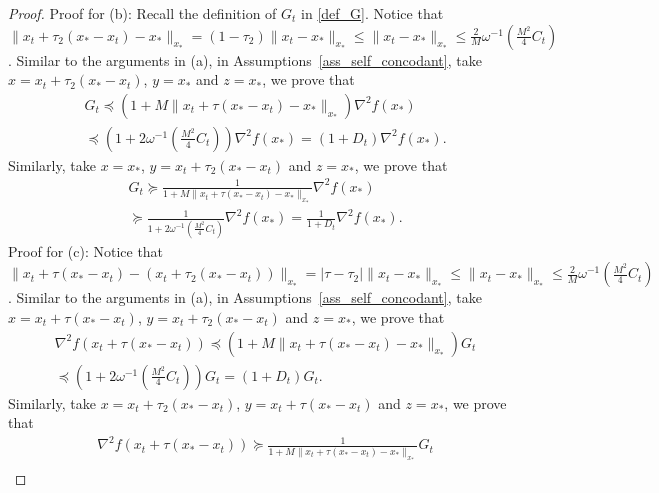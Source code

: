 \documentclass[11pt,letterpaper]{article}
\newcommand\0{{\Vector{0}}}
\newcommand\1{{\Vector{1}}}
\numberwithin{assumption}{section}
\numberwithin{definition}{section}
\numberwithin{theorem}{section}
\numberwithin{remark}{section}
\begin{document}
\begin{proof}
    Proof for (b): Recall the definition of $G_t$ in \eqref{def_G}. Notice that $\|x_t + \tau_2 (x_{*} - x_t) - x_*\|_{x_*} = (1 - \tau_2)\|x_t - x_*\|_{x_*} \leq \|x_t - x_*\|_{x_*} \leq \frac{2}{M}\omega^{-1}(\frac{M^2}{4}C_t)$. Similar to the arguments in (a), in Assumptions~\ref{ass_self_concodant}, take $x = x_t + \tau_2 (x_{*} - x_t)$, $y = x_*$ and $z = x_*$, we prove that 
    \begin{equation}
    \begin{split}
        & G_t \preceq (1 + M\|x_t + \tau (x_{*} - x_t) - x_*\|_{x_*})\nabla^2{f(x_*)} \\
        & \preceq (1 + 2\omega^{-1}(\frac{M^2}{4}C_t))\nabla^2{f(x_*)} = (1 + D_t)\nabla^2{f(x_*)}.
    \end{split}
    \end{equation}
    Similarly, take $x = x_*$, $y = x_t + \tau_2 (x_{*} - x_t)$ and $z = x_*$, we prove that 
    \begin{equation}
    \begin{split}
        & G_t \succeq \frac{1}{1 + M\|x_t + \tau (x_{*} - x_t) - x_*\|_{x_*}}\nabla^2{f(x_*)} \\
        & \succeq \frac{1}{1 + 2\omega^{-1}(\frac{M^2}{4}C_t)}\nabla^2{f(x_*)} = \frac{1}{1 + D_t}\nabla^2{f(x_*)}.
    \end{split}
    \end{equation}
    Proof for (c): Notice that $\|x_t + \tau (x_{*} - x_t) - (x_t + \tau_2 (x_{*} - x_t))\|_{x_*} = |\tau - \tau_2|\|x_t - x_*\|_{x_*} \leq \|x_t - x_*\|_{x_*} \leq \frac{2}{M}\omega^{-1}(\frac{M^2}{4}C_t)$. Similar to the arguments in (a), in Assumptions~\ref{ass_self_concodant}, take $x = x_t + \tau (x_{*} - x_t)$, $y = x_t + \tau_2 (x_{*} - x_t)$ and $z = x_*$, we prove that 
    \begin{equation}
    \begin{split}
        & \nabla^2{f(x_t + \tau(x_* - x_t))}  \preceq (1 + M\|x_t + \tau (x_{*} - x_t) - x_*\|_{x_*})G_t \\
        & \preceq (1 + 2\omega^{-1}(\frac{M^2}{4}C_t))G_t = (1 + D_t)G_t.
    \end{split}
    \end{equation}
    Similarly, take $x = x_t + \tau_2 (x_{*} - x_t)$, $y = x_t + \tau (x_{*} - x_t)$ and $z = x_*$, we prove that 
    \begin{equation}
    \begin{split}
        & \nabla^2{f(x_t + \tau(x_* - x_t))}  \succeq \frac{1}{1 + M\|x_t + \tau (x_{*} - x_t) - x_*\|_{x_*}}G_t \\

\end{split}
\end{equation}
\end{proof}
\end{document}
